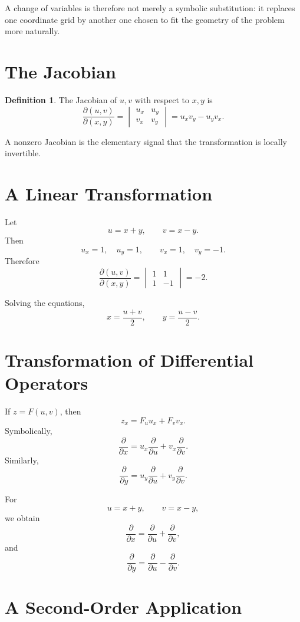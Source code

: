 \documentclass[11pt,oneside]{book}
\theoremstyle{studentthm}
\theoremstyle{definition}
\newtheorem{definition}[theorem]{Definition}
\begin{document}
A change of variables is therefore not merely a symbolic
substitution: it replaces one coordinate grid by another one chosen to
fit the geometry of the problem more naturally.


\section{The Jacobian}

\begin{definition}
The Jacobian of \(u,v\) with respect to \(x,y\) is
\[
\frac{\partial(u,v)}{\partial(x,y)}
=
\begin{vmatrix}
u_x&u_y\\
v_x&v_y
\end{vmatrix}
=
u_xv_y-u_yv_x.
\]
\end{definition}

A nonzero Jacobian is the elementary signal that the transformation is
locally invertible.

\section{A Linear Transformation}

Let
\[
u=x+y,
\qquad
v=x-y.
\]
Then
\[
u_x=1,\quad u_y=1,
\qquad
v_x=1,\quad v_y=-1.
\]
Therefore
\[
\frac{\partial(u,v)}{\partial(x,y)}
=
\begin{vmatrix}
1&1\\
1&-1
\end{vmatrix}
=-2.
\]

Solving the equations,
\[
x=\frac{u+v}{2},
\qquad
y=\frac{u-v}{2}.
\]

\section{Transformation of Differential Operators}

If \(z=F(u,v)\), then
\[
z_x=F_u u_x+F_v v_x.
\]
Symbolically,
\[
\frac{\partial}{\partial x}
=
u_x\frac{\partial}{\partial u}
+
v_x\frac{\partial}{\partial v}.
\]
Similarly,
\[
\frac{\partial}{\partial y}
=
u_y\frac{\partial}{\partial u}
+
v_y\frac{\partial}{\partial v}.
\]

For
\[
u=x+y,\qquad v=x-y,
\]
we obtain
\[
\frac{\partial}{\partial x}
=
\frac{\partial}{\partial u}
+
\frac{\partial}{\partial v},
\]
and
\[
\frac{\partial}{\partial y}
=
\frac{\partial}{\partial u}
-
\frac{\partial}{\partial v}.
\]

\section{A Second-Order Application}
\end{document}
